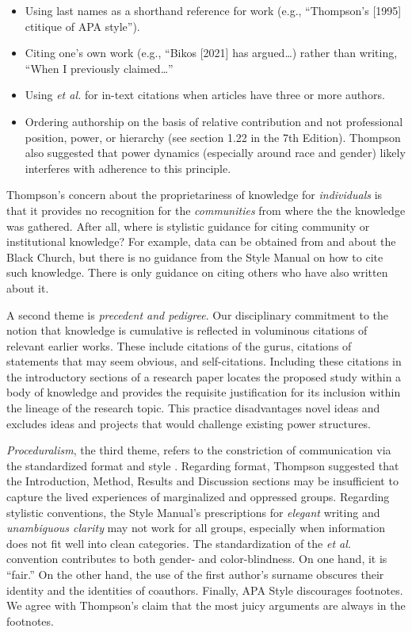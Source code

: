 \documentclass[
  11pt,
]{book}
\providecommand{\tightlist}{%
  \setlength{\itemsep}{0pt}\setlength{\parskip}{0pt}}
\begin{document}
\begin{itemize}
\tightlist
\item
  Using last names as a shorthand reference for work (e.g., ``Thompson's {[}1995{]} ctitique of APA style'').
\item
  Citing one's own work (e.g., ``Bikos {[}2021{]} has argued\ldots) rather than writing, ``When I previously claimed\ldots{}''
\item
  Using \emph{et al.} for in-text citations when articles have three or more authors.
\item
  Ordering authorship on the basis of relative contribution and not professional position, power, or hierarchy (see section 1.22 in the 7th Edition). Thompson \citeyearpar{thompson_gentlemanly_2004} also suggested that power dynamics (especially around race and gender) likely interferes with adherence to this principle.
\end{itemize}

Thompson's \citeyearpar{thompson_gentlemanly_2004} concern about the proprietariness of knowledge for \emph{individuals} is that it provides no recognition for the \emph{communities} from where the the knowledge was gathered. After all, where is stylistic guidance for citing community or institutional knowledge? For example, data can be obtained from and about the Black Church, but there is no guidance from the Style Manual on how to cite such knowledge. There is only guidance on citing others who have also written about it.

A second theme is \emph{precedent and pedigree}. Our disciplinary commitment to the notion that knowledge is cumulative is reflected in voluminous citations of relevant earlier works. These include citations of the gurus, citations of statements that may seem obvious, and self-citations. Including these citations in the introductory sections of a research paper locates the proposed study within a body of knowledge and provides the requisite justification for its inclusion within the lineage of the research topic. This practice disadvantages novel ideas and excludes ideas and projects that would challenge existing power structures.

\emph{Proceduralism}, the third theme, refers to the constriction of communication via the standardized format and style \citep{thompson_gentlemanly_2004}. Regarding format, Thompson suggested that the Introduction, Method, Results and Discussion sections may be insufficient to capture the lived experiences of marginalized and oppressed groups. Regarding stylistic conventions, the Style Manual's prescriptions for \emph{elegant} writing and \emph{unambiguous clarity} may not work for all groups, especially when information does not fit well into clean categories. The standardization of the \emph{et al.} convention contributes to both gender- and color-blindness. On one hand, it is ``fair.'' On the other hand, the use of the first author's surname obscures their identity and the identities of coauthors. Finally, APA Style discourages footnotes. We agree with Thompson's claim that the most juicy arguments are always in the footnotes.
\end{document}
